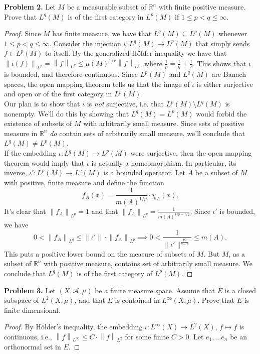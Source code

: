 \documentclass[11pt,letterpaper]{report}
\newcommand{\reals}{\mathbb{R}}
\newcommand{\mcal}[1]{\mathcal{#1}}
\newcommand{\Lp}[2]{\left\|{#1}\right\|_{L^{#2}}}
\begin{document}
\noindent\textbf{Problem 2. }
Let $M$ be a measurable subset of $\reals^n$ with finite positive measure. Prove that $L^q(M)$ is of the first category in $L^p(M)$ if $1\leq p<q\leq \infty$.
\begin{proof}
	Since $M$ has finite measure, we have that $L^q(M)\subseteq L^p(M)$ whenever $1\leq p<q\leq \infty$. Consider the injection $\iota: L^q(M)\to L^p(M)$ that simply sends $f\in L^p(M)$ to itself. By the generalized H\"older inequality we have that $\Lp{\iota(f)}{p} = \Lp{f}{p}\leq \mu(M)^{1/r}\Lp{f}{q}$, where $\frac{1}{p} = \frac{1}{q} + \frac{1}{r}$. This shows that $\iota$ is bounded, and therefore continuous. Since $L^p(M)$ and $L^q(M)$ are Banach spaces, the open mapping theorem tells us that the image of $\iota$ is either surjective and open or of the first category in $L^p(M)$.\\

	\noindent Our plan is to show that $\iota$ is \textit{not} surjective, i.e. that $L^p(M)\setminus L^q(M)$ is nonempty. We'll do this by showing that $L^q(M) = L^p(M)$ would forbid the existence of subsets of $M$ with arbitrarily small measure. Since sets of positive measure in $\mathbb{R}^n$ \textit{do} contain sets of arbitrarily small measure, we'll conclude that $L^q(M)\neq L^p(M)$.\\

	\noindent If the embedding $\iota: L^q(M)\to L^p(M)$ were surjective, then the open mapping theorem would imply that $\iota$ is actually a homeomorphism. In particular, its inverse, $\iota': L^p(M)\to L^q(M)$ is a bounded operator. Let $A$ be a subset of $M$ with positive, finite measure and define the function
	\[
	f_A(x) = \frac{1}{m(A)^{1/p}}\cdot \chi_A(x).
	\]
	It's clear that $\Lp{f_A}{p} = 1$ and that $\Lp{f_A}{q} = \frac{1}{m(A)^{1/p-1/q}}$. Since $\iota'$ is bounded, we have
	\[
	0<\Lp{f_A}{q} \leq \|\iota'\|\cdot \Lp{f_A}{p} \implies 0<\frac{1}{\|\iota'\|^{\frac{pq}{q-p}}}\leq m(A).
	\]
	This puts a positive lower bound on the measure of subsets of $M$. But $M$, as a subset of $\reals^n$ with positive measure, contains set of arbitrarily small measure. We conclude that $L^q(M)$ is of the first category of $L^p(M)$.
\end{proof}


\noindent\textbf{Problem 3. }
Let $(X, \mcal{A}, \mu)$ be a finite measure space. Assume that $E$ is a closed subspace of $L^2(X, \mu)$, and that $E$ is contained in $L^\infty(X, \mu)$. Prove that $E$ is finite dimensional.
\begin{proof}
	By H\"older's inequality, the embedding $\iota: L^\infty(X)\to L^2(X)$, $f\mapsto f$ is continuous, i.e., $\Lp{f}{\infty}\leq C\cdot \Lp{f}{2}$ for some finite $C>0$. Let $e_1, \ldots e_n$ be an orthonormal set in $E$. 
\end{proof}
\end{document}

